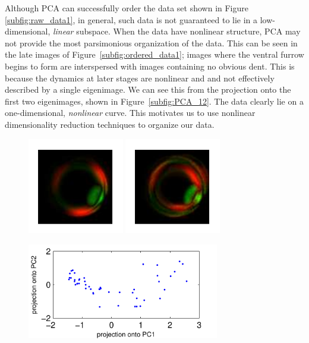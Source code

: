 \documentclass{pnastwo}
\begin{document}
\begin{article}
Although PCA can successfully order the data set shown in Figure \ref{subfig:raw_data1}, in general, such data is not guaranteed to lie in a low-dimensional, {\it linear} subspace.
%
When the data have nonlinear structure, PCA may not provide the most parsimonious organization of the data.
%
This can be seen in the late images of Figure~\ref{subfig:ordered_data1};
images where the ventral furrow begins to form are interspersed with images containing no obvious dent.
%
This is because the dynamics at later stages are nonlinear and and not effectively described by a single eigenimage.
%
We can see this from the projection onto the first two eigenimages, shown in Figure~\ref{subfig:PCA_12}.
%
The data clearly lie on a one-dimensional, {\em nonlinear} curve.
%
This motivates us to use nonlinear dimensionality reduction techniques to organize our data.


\begin{figure}[t]
\includegraphics[width=4.2cm]{PCA_eigenimage1}
\includegraphics[width=4.2cm]{PCA_eigenimage2}

\includegraphics[width=8.4cm]{PCA_12}


\end{figure}
\end{article}
\end{document}
